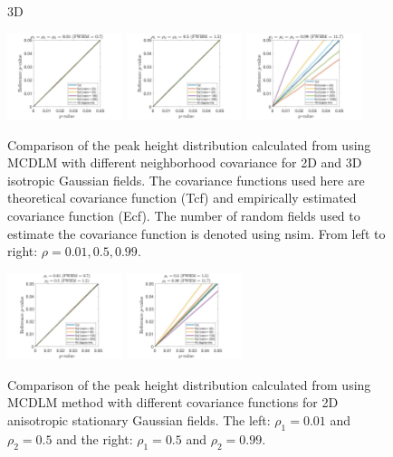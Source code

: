 \documentclass{article}
\begin{document}
\begin{figure}[!htp]
\begin{sideways}
\phantom{------------------}3D
\end{sideways}
\includegraphics[trim=80 5 80 5, clip,width=0.3\textwidth]{figure/3D_rho1_0.01_rho2_0.01_rho3_0.01.jpg}
\includegraphics[trim=80 5 80 5, clip,width=0.3\textwidth]{figure/3D_rho1_0.5_rho2_0.5_rho3_0.5.jpg}
\includegraphics[trim=80 5 80 5, clip,width=0.3\textwidth]{figure/3D_rho1_0.99_rho2_0.99_rho3_0.99.jpg}
\caption{Comparison of the peak height distribution calculated from using MCDLM with different neighborhood covariance for 2D and 3D isotropic Gaussian fields. The covariance functions used here are theoretical covariance function (Tcf) and empirically estimated covariance function (Ecf). The number of random fields used to estimate the covariance function is denoted using nsim. From left to right: $\rho = 0.01, 0.5, 0.99$. \label{fig13}}
\end{figure}

\begin{figure}[!htp]
\centering
\includegraphics[trim=100 5 100 5, clip,width=0.3\textwidth]{figure/2D_rho1_0.01_rho2_0.5.jpg}
\includegraphics[trim=100 5 100 5, clip,width=0.3\textwidth]{figure/2D_rho1_0.5_rho2_0.99.jpg}
\caption{Comparison of the peak height distribution calculated from using MCDLM method with different covariance functions for 2D anisotropic stationary Gaussian fields. The left: $\rho_1 = 0.01$ and $\rho_2 = 0.5$ and the right: $\rho_1 = 0.5$ and $\rho_2 = 0.99$. \label{fig15}}
\end{figure}
\end{document}
